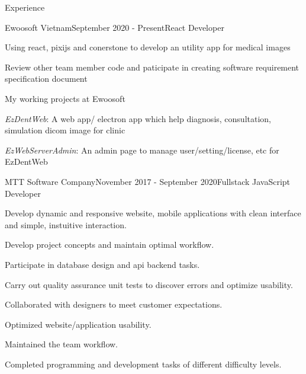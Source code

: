\documentclass{resume}
\begin{document}
  \begin{rSection}{Experience}
    \begin{rSubsection}{Ewoosoft Vietnam}{September 2020 - Present}{React Developer}{}
      \item Using react, pixijs and conerstone to develop an utility app for medical images
      \item Review other team member code and paticipate in creating software requirement specification document 
    \end{rSubsection}

    \begin{rSubsection}{}{}{My working projects at Ewoosoft}{}
      \item {\emph{EzDentWeb}}: A web app/ electron app which help diagnosis, consultation, simulation dicom image for clinic
      \item {\emph{EzWebServerAdmin}}: An admin page to manage user/setting/license, etc for EzDentWeb
    \end{rSubsection}

    \begin{rSubsection}{MTT Software Company}{November 2017 - September 2020}{Fullstack JavaScript Developer}{}
      \item Develop dynamic and responsive website, mobile applications with clean interface and simple, instuitive interaction.
      \item Develop project concepts and maintain optimal workflow.
      \item Participate in database design and api backend tasks.
      \item Carry out quality assurance unit tests to discover errors and optimize usability.
      \item Collaborated with designers to meet customer expectations.
      \item Optimized website/application usability.
      \item Maintained the team workflow.
      \item Completed programming and development tasks of different difficulty levels.
    \end{rSubsection}


\end{rSection}
\end{document}
